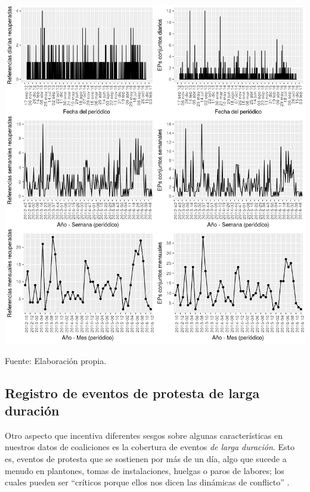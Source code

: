 \documentclass[letterpaper, 11pt]{book}
\theoremstyle{definition}
\theoremstyle{remark}
\begin{document}
\hspace{-1.5em}\begin{minipage}{\linewidth}
\centering
{} \label{3.1_serieT_fuentes}
\hspace{-0.5em}\includegraphics[scale=0.76]{img/3.1_serieT_fuentes.png}
\par\bigskip
\small Fuente: Elaboración propia.
\end{minipage}



\subsection{Registro de eventos de protesta de larga duración}
\label{sec:EPs largos}


Otro aspecto que incentiva diferentes sesgos sobre algunas características en nuestros datos de coaliciones es la cobertura de eventos \emph{de larga duración}. 
Esto es, eventos de protesta que se sostienen por más de un día, algo que sucede a menudo en plantones, tomas de instalaciones, huelgas o paros de labores; los cuales pueden ser ``críticos porque ellos nos dicen las dinámicas de conflicto'' \citep[129]{2003_Wada_Tesis}. 
\end{document}
